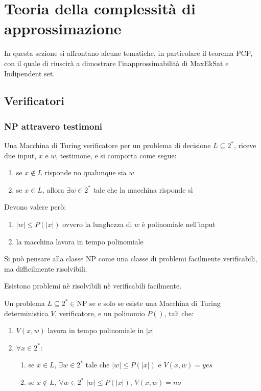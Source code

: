 \section{Teoria della complessità di approssimazione}

In questa sezione si affrontano alcune tematiche, in particolare il teorema PCP, 
con il quale di riuscirà a dimostrare l'inapprossimabilità di MaxEkSat e Indipendent set.

\subsection{Verificatori}
\subsubsection{NP attravero testimoni}
Una Macchina di Turing verificatore per un problema di decisione $L \subseteq 2^*$, riceve due input, $x$ e $w$, testimone, 
e si comporta come segue:
\begin{enumerate}
    \item se $x \notin L$ risponde no qualunque sia $w$
    \item se $x \in L$, allora $\exists w\in 2^*$ tale che la macchina risponde sì
\end{enumerate}
Devono valere però:
\begin{enumerate}
    \item $|w| \leq P(|x|)$ ovvero la lunghezza di $w$ è polinomiale nell'input
    \item la macchina lavora in tempo polinomiale
\end{enumerate}

\begin{remark}
    Si può pensare alla classe NP come una classe di problemi facilmente verificabili, ma difficilmente 
    risolvibili.
\end{remark}
\begin{remark}
    Esistono problemi nè risolvibili nè  verificabili facilmente.
\end{remark}
\begin{theorem}
    Un problema $L \subseteq 2^* \in $NP se e solo se esiste una Macchina di Turing deterministica $V$, verificatore,
    e un polinomio $P()$, tali che:
    \begin{enumerate}
        \item $V(x,w)$ lavora in tempo polinomiale in $|x|$
        \item $\forall x \in 2^*$:
        \begin{enumerate}
            \item se $x \in L$, $\exists w \in 2^*$ tale che $|w| \leq P(|x|)$ e $V(x,w) = \mathit{yes}$
            \item se $x \notin L$, $\forall w \in 2^*$ $|w| \leq P(|x|)$, $V(x,w) = \mathit{no}$
        \end{enumerate}
    \end{enumerate}
\end{theorem}


